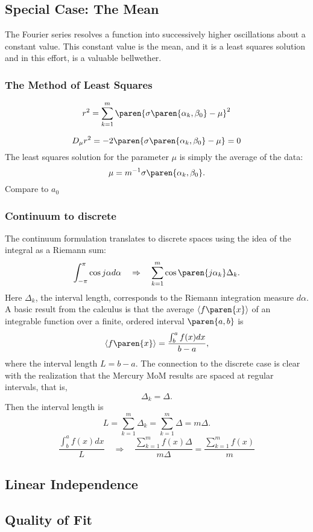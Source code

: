 \subsection{\label{sec:special-case}Special Case: The Mean}
The Fourier series resolves a function into successively higher oscillations about a constant value. This constant value is the mean, and it is a least squares solution and in this effort, is a valuable bellwether.

\subsubsection{The Method of Least Squares}
\begin{equation}
	r^{2} = \sum_{k=1}^{m} \paren{ \sigma\paren{\alpha_{k},\beta_{0}} - \mu }^{2}
\end{equation}

\begin{equation}
	D_{\mu} r^{2} = -2 \paren{ \sigma\paren{\alpha_{k},\beta_{0}} - \mu } = 0
\end{equation}
The least squares solution for the parameter $\mu$ is simply the average of the data:
\begin{equation}
	\mu = m^{-1}\sigma\paren{\alpha_{k},\beta_{0}}.
\end{equation}
Compare to $a_{0}$

\subsubsection{Continuum to discrete}
The continuum formulation translates to discrete spaces using the idea of the integral as a Riemann sum: 
\begin{equation}
	\int_{-\pi}^{\pi}{ \cos j\alpha d\alpha } \quad \Rightarrow \quad \sum_{k=1}^{m} \cos \paren{j\alpha_{k}} \Delta_{k}.
\end{equation}
Here $\Delta_{k}$, the interval length, corresponds to the Riemann integration measure $d\alpha$. A basic result from the calculus is that the average $\langle f\paren{x} \rangle$ of an integrable function over a finite, ordered interval $\paren{a,b}$ is
\begin{equation}
	\langle f\paren{x} \rangle = \frac{\int_{b}^{a} f(x) dx }{b-a},
\end{equation}
where the interval length $L=b-a$. The connection to the discrete case is clear with the realization that the Mercury MoM results are spaced at regular intervals, that is,
$$ \Delta_{k} = \Delta.$$ 
Then the interval length is
\begin{equation}
	L = \sum_{k=1}^{m} \Delta_{k} = \sum_{k=1}^{m}  \Delta = m \Delta.
\end{equation}
\begin{equation}
	\frac{\int_{b}^{a} f(x) dx }{L} \quad \Rightarrow \quad \frac{\sum_{k=1}^{m} f(x) \Delta}{m \Delta} =  \frac{\sum_{k=1}^{m} f(x)}{m}
\end{equation}

\subsection{Linear Independence}
	
\subsection{Quality of Fit}

\endinput  %
